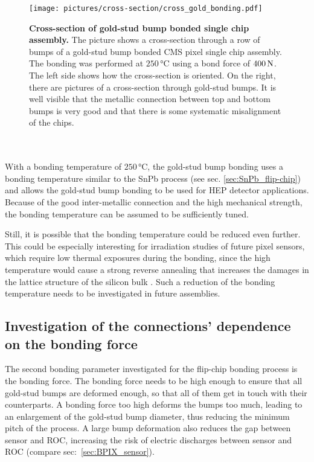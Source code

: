 \begin{figure}
\begin{center}
\texttt{[image: pictures/cross-section/cross\_gold\_bonding.pdf]}
\end{center}
\caption[Cross-section of gold-stud bump bonded single chip assembly]{\textbf{Cross-section of gold-stud bump bonded single chip assembly.} The picture shows a cross-section through a row of bumps of a gold-stud bump bonded \ac{CMS} pixel single chip assembly. The bonding was performed at $250\,\si{\degreeCelsius}$ using a bond force of $400\,\rm{N}$. The left side shows how the cross-section is oriented. On the right, there are pictures of a cross-section through gold-stud bumps. It is well visible that the metallic connection between top and bottom bumps is very good and that there is some systematic misalignment of the chips.}\label{pic:cross_gold_bonding}
\end{figure}
\\
\\With a bonding temperature of $250\,\si{\degreeCelsius}$, the gold-stud bump bonding uses a bonding temperature similar to the SnPb process (see sec. \ref{sec:SnPb_flip-chip}) and allows the gold-stud bump bonding to be used for \ac{HEP} detector applications. Because of the good inter-metallic connection and the high mechanical strength, the bonding temperature can be assumed to be sufficiently tuned.

Still, it is possible that the bonding temperature could be reduced even further. This could be especially interesting for irradiation studies of future pixel sensors, which require low thermal exposures during the bonding, since the high temperature would cause a strong reverse annealing that increases the damages in the lattice structure of the silicon bulk \cite{Mol99}. Such a reduction of the bonding temperature needs to be investigated in future assemblies. 


\subsection{Investigation of the connections' dependence on the bonding force}\label{sec:flip-chip_bonding_force}
The second bonding parameter investigated for the flip-chip bonding process is the bonding force. The bonding force needs to be high enough to ensure that all gold-stud bumps are deformed enough, so that all of them get in touch with their counterparts. A bonding force too high deforms the bumps too much, leading to an enlargement of the gold-stud bump diameter, thus reducing the minimum pitch of the process. A large bump deformation also reduces the gap between sensor and \ac{ROC}, increasing the risk of electric discharges between sensor and \ac{ROC} (compare sec:~\ref{sec:BPIX_sensor}).


